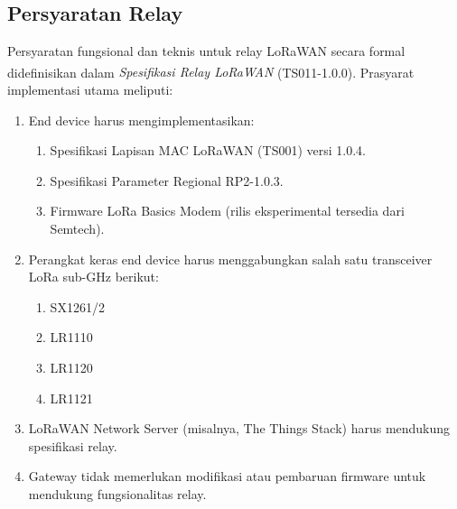 \subsection{Persyaratan Relay}
Persyaratan fungsional dan teknis untuk relay LoRaWAN secara formal didefinisikan dalam \emph{Spesifikasi Relay LoRaWAN\textsuperscript{\textregistered}} (TS011-1.0.0). Prasyarat implementasi utama meliputi:
\begin{enumerate}
    \item End device harus mengimplementasikan:
          \begin{enumerate}
              \item Spesifikasi Lapisan MAC LoRaWAN (TS001) versi 1.0.4.
              \item Spesifikasi Parameter Regional RP2-1.0.3.
              \item Firmware LoRa Basics Modem (rilis eksperimental tersedia dari Semtech).
          \end{enumerate}
    \item Perangkat keras end device harus menggabungkan salah satu transceiver LoRa sub-GHz berikut:
          \begin{enumerate}
              \item SX1261/2
              \item LR1110
              \item LR1120
              \item LR1121
          \end{enumerate}
    \item LoRaWAN Network Server (misalnya, The Things Stack) harus mendukung spesifikasi relay.
    \item Gateway tidak memerlukan modifikasi atau pembaruan firmware untuk mendukung fungsionalitas relay.
\end{enumerate}

